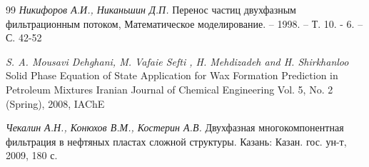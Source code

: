 \documentclass[12pt,twoside,a4paper]{uz_ku}
\begin{document}
\begin{thebibliography}{99}
\textit {Никифоров А.И., Никаньшин Д.П.} Перенос частиц двухфазным фильтрационным потоком, Математическое моделирование. – 1998. – Т. 10. - 6. – С. 42-52

\textit {S. A. Mousavi Dehghani, M. Vafaie Sefti , H. Mehdizadeh and H. Shirkhanloo} Solid Phase Equation of State Application for Wax Formation Prediction in Petroleum Mixtures Iranian Journal of Chemical Engineering Vol. 5, No. 2 (Spring), 2008, IAChE

\textit{Чекалин А.Н., Конюхов В.М., Костерин А.В.} Двухфазная многокомпонентная фильтрация в нефтяных пластах сложной структуры. Казань: Казан. гос. ун-т, 2009, 180 с.
\end{thebibliography}

\end{document}
